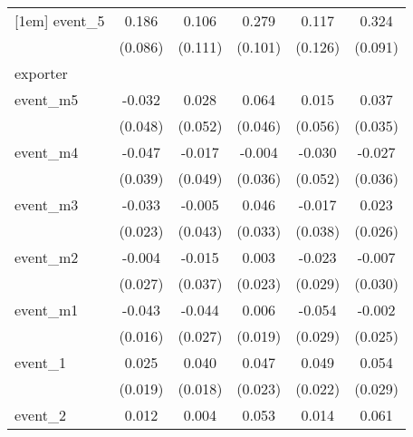 {\begin{tabular}{l*{5}{c}}
[1em]
event\_5     &       0.186\sym{*}  &       0.106         &       0.279\sym{**} &       0.117         &       0.324\sym{***}\\
            &     (0.086)         &     (0.111)         &     (0.101)         &     (0.126)         &     (0.091)         \\
\hline
exporter    &                     &                     &                     &                     &                     \\
event\_m5    &      -0.032         &       0.028         &       0.064         &       0.015         &       0.037         \\
            &     (0.048)         &     (0.052)         &     (0.046)         &     (0.056)         &     (0.035)         \\
[1em]
event\_m4    &      -0.047         &      -0.017         &      -0.004         &      -0.030         &      -0.027         \\
            &     (0.039)         &     (0.049)         &     (0.036)         &     (0.052)         &     (0.036)         \\
[1em]
event\_m3    &      -0.033         &      -0.005         &       0.046         &      -0.017         &       0.023         \\
            &     (0.023)         &     (0.043)         &     (0.033)         &     (0.038)         &     (0.026)         \\
[1em]
event\_m2    &      -0.004         &      -0.015         &       0.003         &      -0.023         &      -0.007         \\
            &     (0.027)         &     (0.037)         &     (0.023)         &     (0.029)         &     (0.030)         \\
[1em]
event\_m1    &      -0.043\sym{**} &      -0.044         &       0.006         &      -0.054         &      -0.002         \\
            &     (0.016)         &     (0.027)         &     (0.019)         &     (0.029)         &     (0.025)         \\
[1em]
event\_1     &       0.025         &       0.040\sym{*}  &       0.047\sym{*}  &       0.049\sym{*}  &       0.054         \\
            &     (0.019)         &     (0.018)         &     (0.023)         &     (0.022)         &     (0.029)         \\
[1em]
event\_2     &       0.012         &       0.004         &       0.053\sym{*}  &       0.014         &       0.061\sym{*}  \\

\end{tabular}}
